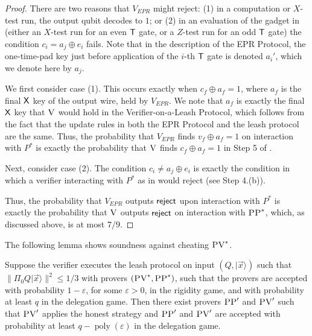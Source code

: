 \documentclass{toc}
\newcommand{\ket}[1]{|#1\rangle}
\DeclareMathOperator{\poly}{poly}
\newcommand{\eps}{\varepsilon}
\newcommand{\ver}{\textsc{V}}
\newcommand{\pv}{\textsc{PV}}
\newcommand{\pp}{\textsc{PP}}
\begin{document}
\begin{proof}
There are two reasons that $V_{EPR}$ might reject: (1) in a computation or $X$-test run, the output qubit decodes to $1$; or (2) in an evaluation of the gadget in  (either an $X$-test run for an even $\sf T$ gate, or a $Z$-test run for an odd $\sf T$ gate) the condition ${c}_i=a_j\oplus e_i$ fails. Note that in the description of the EPR Protocol, the one-time-pad key just before application of the $i$-th $\sf T$ gate is denoted $a_i'$, which we denote here by $a_j$. 

We first consider case (1). This occurs exactly when ${c_f}\oplus a_f=1$, where $a_f$ is the final $\sf X$ key of the output wire, held by $V_{EPR}$. We note that $a_f$ is exactly the final $\sf X$ key that $\ver$ would hold in the Verifier-on-a-Leash Protocol, which follows from the fact that the update rules in both the EPR Protocol and the leash protocol are the same. Thus, the probability that $V_{EPR}$ finds ${v_f}\oplus a_f=1$ on interaction with $P^*$ is exactly the probability that $\ver$ finds $c_f\oplus a_f=1$ in Step 5 of . 

Next, consider case (2). The condition ${c}_i\neq a_{j}\oplus e_i$ is exactly
 the condition in which a verifier interacting with $P^*$ as in  would reject (see Step 4.(b)).

Thus, the probability that $V_{EPR}$ outputs $\sf reject$ upon interaction with $P^*$ is exactly the probability that $\ver$ outputs $\sf reject$ on interaction with $\pp^*$, which, as discussed above, is at most $7/9$.
\end{proof}





\noindent The following lemma shows soundness against cheating $\pv^*$.

\begin{lemma}\label{soundlemma}
Suppose the verifier executes the leash protocol  on input $(Q,\ket{\vec{x}})$ such that $\|\Pi_0 Q\ket{\vec{x}}\|^2 \leq 1/3$ with provers $(\pv^*,\pp^*)$, such that the provers are accepted with probability $1-\eps$, for some $\eps>0$, in the rigidity game, and with probability at least $q$ in the delegation game. Then there exist provers $\pp'$ and $\pv'$ such that $\pv'$ applies the honest strategy and $\pp'$ and $\pv'$ are accepted with probability at least $q-\poly(\eps)$ in the delegation game.
\end{lemma}
\end{document}
